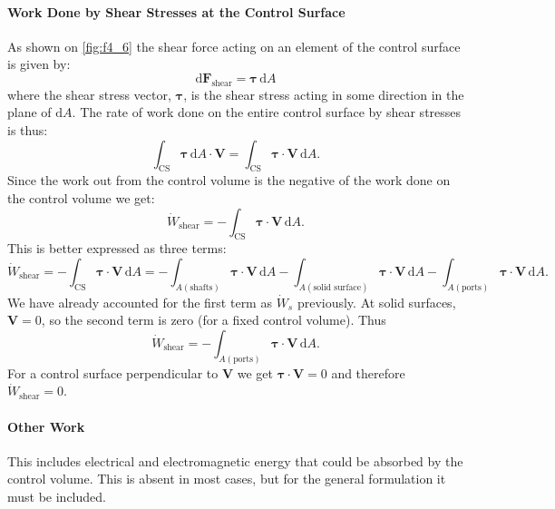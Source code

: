 \paragraph{Work Done by Shear Stresses at the Control Surface}
As shown on \autoref{fig:f4_6} the shear force acting on an element of the control surface is given by:
\[ 
\mathrm{d} \textbf{F}_{\mathrm{shear}} = \bm{\tau} \, \mathrm{d}A
\]
where the shear stress vector, $\bm{\tau}$, is the shear stress acting in some direction in the plane of $\mathrm{d}A$. The rate of work done on the entire control surface by shear stresses is thus:
\[ 
\int_{\mathrm{CS}} \bm{\tau} \, \mathrm{d}A \cdot \textbf{V} = \int_{\mathrm{CS}} \bm{\tau} \cdot \textbf{V} \, \mathrm{d}A
.\]
Since the work out from the control volume is the negative of the work done on the control volume we get:
\[ 
\dot{W}_{\mathrm{shear}} = - \int_{\mathrm{CS}} \bm{\tau} \cdot \textbf{V} \, \mathrm{d}A
.\]
This is better expressed as three terms:
\[ 
  \dot{W}_{\mathrm{shear}} = - \int_{\mathrm{CS}} \bm{\tau} \cdot \textbf{V} \, \mathrm{d}A = - \int_{A (\mathrm{shafts})} \bm{\tau} \cdot \textbf{V} \, \mathrm{d}A - \int_{A (\text{solid surface})} \bm{\tau} \cdot \textbf{V} \, \mathrm{d}A - \int_{A (\mathrm{ports})} \bm{\tau} \cdot \textbf{V} \, \mathrm{d}A 
.\]
We have already accounted for the first term as $\dot{W}_s$ previously. At solid surfaces, $\textbf{V} = 0$, so the second term is zero (for a fixed control volume). Thus
\[ 
\dot{W}_{\mathrm{shear}} = - \int_{A (\mathrm{ports})} \bm{\tau} \cdot \textbf{V} \, \mathrm{d}A
.\]
For a control surface perpendicular to $\textbf{V}$ we get $\bm{\tau} \cdot \textbf{V} = 0$ and therefore $\dot{W}_{\mathrm{shear}} = 0$. 

\paragraph{Other Work}
This includes electrical and electromagnetic energy that could be absorbed by the control volume. This is absent in most cases, but for the general formulation it must be included.

